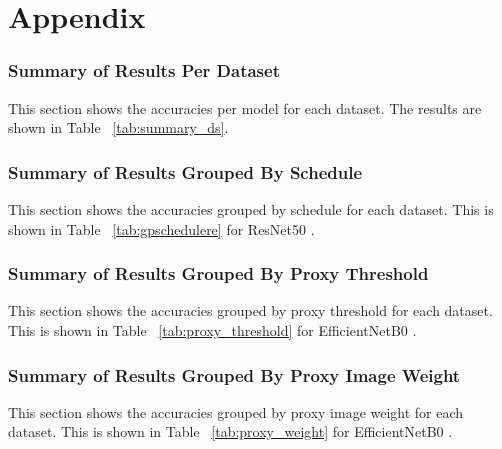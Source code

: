 \chapter{Appendix}
\subsection{Summary of Results Per Dataset}
This section shows the accuracies per model for each dataset. The results are shown in Table ~\ref{tab:summary_ds}.


\subsection{Summary of Results Grouped By Schedule}
This section shows the accuracies grouped by schedule for each dataset. This is shown in Table ~\ref{tab:gpschedulere} for ResNet50 \cite{heDeepResidualLearning2016}.



\subsection{Summary of Results Grouped By Proxy Threshold}
This section shows the accuracies grouped by proxy threshold for each dataset. This is shown in Table ~\ref{tab:proxy_threshold} for EfficientNetB0 \cite{tanEfficientnetRethinkingModel2019}.


\subsection{Summary of Results Grouped By Proxy Image Weight}
This section shows the accuracies grouped by proxy image weight for each dataset. This is shown in Table ~\ref{tab:proxy_weight} for EfficientNetB0 \cite{tanEfficientnetRethinkingModel2019}.
